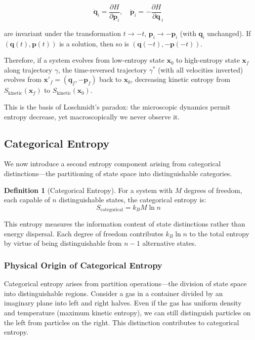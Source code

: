 \documentclass[twocolumn,10pt]{article}
\theoremstyle{definition}
\newtheorem{definition}[theorem]{Definition}
\theoremstyle{remark}
\begin{document}
$$
\dot{\mathbf{q}}_i = \frac{\partial H}{\partial \mathbf{p}_i}, \quad \dot{\mathbf{p}}_i = -\frac{\partial H}{\partial \mathbf{q}}_i
$$

are invariant under the transformation $t \to -t$, $\mathbf{p}_i \to -\mathbf{p}_i$ (with $\mathbf{q}_i$ unchanged). If $(\mathbf{q}(t), \mathbf{p}(t))$ is a solution, then so is $(\mathbf{q}(-t), -\mathbf{p}(-t))$.

Therefore, if a system evolves from low-entropy state $\mathbf{x}_0$ to high-entropy state $\mathbf{x}_f$ along trajectory $\gamma$, the time-reversed trajectory $\gamma^*$ (with all velocities inverted) evolves from $\mathbf{x}'_f = (\mathbf{q}_f, -\mathbf{p}_f)$ back to $\mathbf{x}_0$, decreasing kinetic entropy from $S_{\text{kinetic}}(\mathbf{x}_f)$ to $S_{\text{kinetic}}(\mathbf{x}_0)$.

This is the basis of Loschmidt's paradox: the microscopic dynamics permit entropy decrease, yet macroscopically we never observe it.

\subsection{Categorical Entropy}

We now introduce a second entropy component arising from categorical distinctions—the partitioning of state space into distinguishable categories.

\begin{definition}[Categorical Entropy]
For a system with $M$ degrees of freedom, each capable of $n$ distinguishable states, the categorical entropy is:
$$
S_{\text{categorical}} = k_B M \ln n
$$
\end{definition}

This entropy measures the information content of state distinctions rather than energy dispersal. Each degree of freedom contributes $k_B \ln n$ to the total entropy by virtue of being distinguishable from $n-1$ alternative states.

\subsubsection{Physical Origin of Categorical Entropy}

Categorical entropy arises from partition operations—the division of state space into distinguishable regions. Consider a gas in a container divided by an imaginary plane into left and right halves. Even if the gas has uniform density and temperature (maximum kinetic entropy), we can still distinguish particles on the left from particles on the right. This distinction contributes to categorical entropy.
\end{document}
